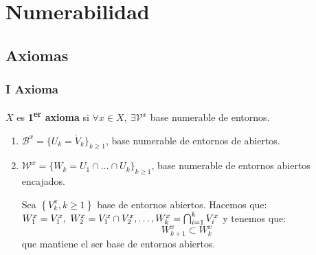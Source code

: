 \chapter{Numerabilidad}%
\label{cha:numerabilidad}

\section{Axiomas}%
\label{sec:axiomas}
\subsection{I Axioma}%
\label{sub:i_axioma}
\begin{defi}[I Ax.]
$X$ es \textbf{1\textsuperscript{er} axioma} si $\forall x \in X,\ \exists \mathcal{V}^x$ base numerable de entornos.  
\end{defi}

\begin{obs}
\begin{enumerate}
    \item $\mathcal{B}^x = \{U_k = \mathring{V}_k \}_{k \ge 1}$, base numerable de entornos de abiertos.
    \item $\mathcal{W}^x = \{W_k = U_1 \cap \ldots \cap U_k\}_{k \ge 1}$, base numerable de entornos abiertos encajados.
    \begin{demo}
        Sea $\left\{ V_k^x, k \ge 1 \right\}$ base de entornos abiertos. Hacemos que: $W_1^x = V_1^x,\ W_2^x = V_1^x \cap V_2^x, \ldots,\\ W_k^x = \bigcap_{i = 1}^{k} V_i^x$ y tenemos que:
        \[
        W_{k+1}^x \subset W_{k}^x
        \]
        que mantiene el ser base de entornos abiertos.
    \end{demo}
\end{enumerate}
\end{obs}

